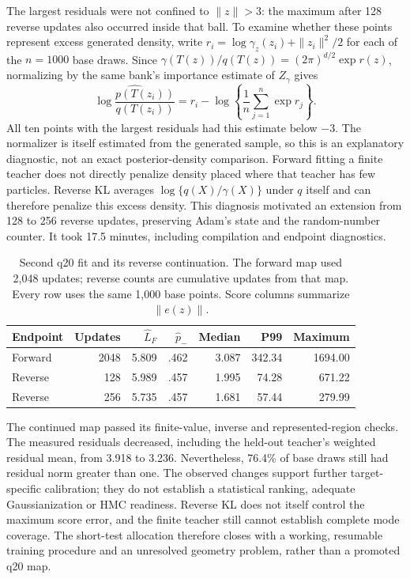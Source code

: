 The largest residuals were not confined to $\|z\|>3$: the maximum after 128
reverse updates also occurred inside that ball. To examine whether these
points represent excess generated density, write
$r_i=\log\gamma_z(z_i)+\|z_i\|^2/2$ for each of the $n=1000$ base draws.
Since $\gamma(T(z))/q(T(z))=(2\pi)^{d/2}\exp r(z)$, normalizing by the same
bank's importance estimate of $Z_\gamma$ gives
\begin{equation}
 \widehat{\log\frac{p(T(z_i))}{q(T(z_i))}}
 =r_i-\log\left\{\frac1n\sum_{j=1}^{n}\exp r_j\right\}.
\end{equation}
All ten points with the largest residuals had this estimate below $-3$.
The normalizer is itself estimated from the generated sample, so this is an
explanatory diagnostic, not an exact posterior-density comparison.
Forward fitting a finite teacher does not directly penalize density placed
where that teacher has few particles. Reverse KL averages
$\log\{q(X)/\gamma(X)\}$ under $q$ itself and can therefore penalize this
excess density. This diagnosis motivated an extension from 128 to 256 reverse
updates, preserving Adam's state and the random-number counter. It took
17.5 minutes, including compilation and endpoint diagnostics.

\begin{table}[htbp]
\centering
\caption{Second q20 fit and its reverse continuation. The forward map used
2,048 updates; reverse counts are cumulative updates from that map. Every
row uses the same 1,000 base points. Score columns summarize $\|e(z)\|$.}
\label{tab:neutra-q20-continuation}
\begin{tabular}{lrrrrrr}
\toprule
Endpoint & Updates & $\widehat L_F$ & $\hat p_-$ & Median & P99 & Maximum\\
\midrule
Forward & 2048 & 5.809 & .462 & 3.087 & 342.34 & 1694.00\\
Reverse & 128 & 5.989 & .457 & 1.995 & 74.28 & 671.22\\
Reverse & 256 & 5.735 & .457 & 1.681 & 57.44 & 279.99\\
\bottomrule
\end{tabular}
\end{table}

The continued map passed its finite-value, inverse and represented-region
checks. The measured residuals decreased, including the held-out teacher's
weighted residual mean, from 3.918 to 3.236. Nevertheless, 76.4\% of base
draws still had residual norm greater than one. The observed changes support
further target-specific calibration; they do not establish a statistical
ranking, adequate Gaussianization or HMC readiness. Reverse KL does not itself
control the maximum score error, and the finite teacher still cannot establish
complete mode coverage. The short-test allocation therefore closes with a
working, resumable training procedure and an unresolved geometry problem,
rather than a promoted q20 map.

